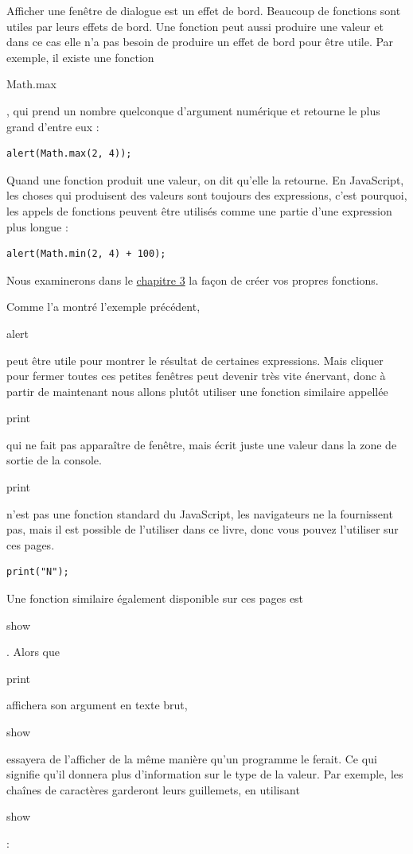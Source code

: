 \documentclass{FramateX}
\renewcommand{\texttt}[1]{\begin{sffamily}{#1}\end{sffamily}}
\begin{document}
\begin{center}\end{center}

Afficher une fenêtre de dialogue est un effet de bord. Beaucoup de
fonctions sont utiles par leurs effets de bord. Une fonction peut aussi
produire une valeur et dans ce cas elle n'a pas besoin de produire un
effet de bord pour être utile. Par exemple, il existe une fonction
\texttt{Math.max}, qui prend un nombre quelconque d'argument numérique
et retourne le plus grand d'entre eux :

\begin{lstlisting}
alert(Math.max(2, 4));
\end{lstlisting}
Quand une fonction produit une valeur, on dit qu'elle la retourne. En
JavaScript, les choses qui produisent des valeurs sont toujours des
expressions, c'est pourquoi, les appels de fonctions peuvent être
utilisés comme une partie d'une expression plus longue :

\begin{lstlisting}
alert(Math.min(2, 4) + 100);
\end{lstlisting}
Nous examinerons dans le \href{chapter3.html}{chapitre 3} la façon de
créer vos propres fonctions.

\begin{center}\end{center}

Comme l'a montré l'exemple précédent, \texttt{alert} peut être utile
pour montrer le résultat de certaines expressions. Mais cliquer pour
fermer toutes ces petites fenêtres peut devenir très vite énervant, donc
à partir de maintenant nous allons plutôt utiliser une fonction
similaire appellée \texttt{print} qui ne fait pas apparaître de fenêtre,
mais écrit juste une valeur dans la zone de sortie de la console.
\texttt{print} n'est pas une fonction standard du JavaScript, les
navigateurs ne la fournissent pas, mais il est possible de l'utiliser
dans ce livre, donc vous pouvez l'utiliser sur ces pages.

\begin{lstlisting}
print("N");
\end{lstlisting}
Une fonction similaire également disponible sur ces pages est
\texttt{show}. Alors que \texttt{print} affichera son argument en texte
brut, \texttt{show} essayera de l'afficher de la même manière qu'un
programme le ferait. Ce qui signifie qu'il donnera plus d'information
sur le type de la valeur. Par exemple, les chaînes de caractères
garderont leurs guillemets, en utilisant \texttt{show}:
\end{document}
